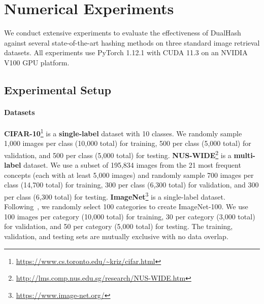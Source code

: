 \begingroup
\setlength{\textfloatsep}{10pt plus 2pt minus 2pt}
\setlength{\floatsep}{8pt plus 2pt minus 2pt}
\setlength{\intextsep}{10pt plus 2pt minus 2pt}
\captionsetup{skip=4pt}
\renewcommand{\topfraction}{0.95}
\renewcommand{\bottomfraction}{0.85}
\renewcommand{\textfraction}{0.05}
\section{Numerical Experiments}
\label{Section: Numerical experiments}
We conduct extensive experiments to evaluate the effectiveness of DualHash against several state-of-the-art hashing methods on three
standard image retrieval datasets. All experiments use PyTorch 1.12.1 with CUDA 11.3 on an NVIDIA V100 GPU platform.
\subsection{Experimental Setup}
\label{Subsection: Experimental Setup}
\paragraph{Datasets} \textbf{CIFAR-10}\footnote{\url{https://www.cs.toronto.edu/~kriz/cifar.html}} is a \textbf{single-label} dataset with 10 classes. 
We randomly sample 1,000 images per class (10,000 total) for training, 500 per class (5,000 total) for validation, and 500 per class (5,000 total) for testing.
\textbf{NUS-WIDE}\footnote{\url{http://lms.comp.nus.edu.sg/research/NUS-WIDE.htm}} is a \textbf{multi-label} dataset. 
We use a subset of 195,834 images from the 21 most frequent concepts (each with at least 5,000 images) and randomly sample 700 images per class (14,700 total) for training, 300 per class (6,300 total) for validation, and 300 per class (6,300 total) for testing.
\textbf{ImageNet}\footnote{\url{https://www.image-net.org/}} is a single-label dataset. Following~\cite{Cao2017HashNetDL}, we randomly select 100 categories to create ImageNet-100. We use 100 images per category (10,000 total) for training, 30 per category (3,000 total) for validation, and 50 per category (5,000 total) for testing. The training, validation, and testing sets are mutually exclusive with no data overlap.

